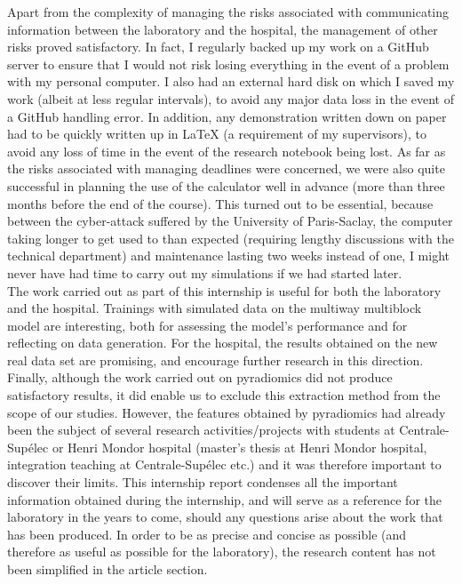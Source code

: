 \documentclass[preprint,12pt]{elsarticle}
\begin{document}
\indent Apart from the complexity of managing the risks associated with communicating information between the laboratory and the hospital, the management of other risks proved satisfactory. In fact, I regularly backed up my work on a GitHub server to ensure that I would not risk losing everything in the event of a problem with my personal computer. I also had an external hard disk on which I saved my work (albeit at less regular intervals), to avoid any major data loss in the event of a GitHub handling error. In addition, any demonstration written down on paper had to be quickly written up in LaTeX (a requirement of my supervisors), to avoid any loss of time in the event of the research notebook being lost. As far as the risks associated with managing deadlines were concerned, we were also quite successful in planning the use of the calculator well in advance (more than three months before the end of the course). This turned out to be essential, because between the cyber-attack suffered by the University of Paris-Saclay, the computer taking longer to get used to than expected (requiring lengthy discussions with the technical department) and maintenance lasting two weeks instead of one, I might never have had time to carry out my simulations if we had started later.\\
\indent The work carried out as part of this internship is useful for both the laboratory and the hospital. Trainings with simulated data on the multiway multiblock model are interesting, both for assessing the model's performance and for reflecting on data generation. For the hospital, the results obtained on the new real data set are promising, and encourage further research in this direction. Finally, although the work carried out on pyradiomics did not produce satisfactory results, it did enable us to exclude this extraction method from the scope of our studies. However, the features obtained by pyradiomics had already been the subject of several research activities/projects with students at Centrale-Supélec or Henri Mondor hospital (master's thesis at Henri Mondor hospital, integration teaching at Centrale-Supélec etc.) and it was therefore important to discover their limits. This internship report condenses all the important information obtained during the internship, and will serve as a reference for the laboratory in the years to come, should any questions arise about the work that has been produced. In order to be as precise and concise as possible (and therefore as useful as possible for the laboratory), the research content has not been simplified in the article section.\\
\end{document}
